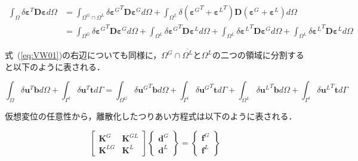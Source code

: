 \begin{align}
  \int_{\Omega} \delta\boldsymbol{\varepsilon}^T\boldsymbol{D}\boldsymbol{\varepsilon} d\Omega
  &=\int_{\Omega^G\cap\overline{\Omega^L}} \delta{\boldsymbol{\varepsilon}^G}^T\boldsymbol{D}\boldsymbol{\varepsilon}^G d\Omega
  +\int_{\Omega^L} \delta({\boldsymbol{\varepsilon}^G}^T+{\boldsymbol{\varepsilon}^L}^T)\boldsymbol{D}(\boldsymbol{\varepsilon}^G+\boldsymbol{\varepsilon}^L) d\Omega \nonumber \\
  &=\int_{\Omega^G} \delta{\boldsymbol{\varepsilon}^G}^T\boldsymbol{D}\boldsymbol{\varepsilon}^G d\Omega
  +\int_{\Omega^L} \delta{\boldsymbol{\varepsilon}^G}^T\boldsymbol{D}\boldsymbol{\varepsilon}^L d\Omega
  +\int_{\Omega^L} \delta{\boldsymbol{\varepsilon}^L}^T\boldsymbol{D}\boldsymbol{\varepsilon}^G d\Omega
  +\int_{\Omega^L} \delta{\boldsymbol{\varepsilon}^L}^T\boldsymbol{D}\boldsymbol{\varepsilon}^L d\Omega
\end{align}

\noindent
式~(\ref{eq:VW01})の右辺についても同様に，$\Omega^G\cap\overline{\Omega^L}$と$\Omega^L$の二つの領域に分割すると以下のように表される．

\begin{equation}
  \int_\Omega \delta\boldsymbol{u}^T\boldsymbol{b} d\Omega+\int_{\Gamma^t} \delta\boldsymbol{u}^T\boldsymbol{t} d\Gamma
  =\int_{\Omega^G} \delta{\boldsymbol{u}^G}^T\boldsymbol{b} d\Omega+\int_{\Gamma^t} \delta{\boldsymbol{u}^G}^T\boldsymbol{t} d\Gamma
  +\int_{\Omega^L} \delta{\boldsymbol{u}^L}^T\boldsymbol{b} d\Omega+\int_{\Gamma^t} \delta{\boldsymbol{u}^L}^T\boldsymbol{t} d\Gamma
\end{equation}

\noindent
仮想変位の任意性から，離散化したつりあい方程式は以下のように表される．

\begin{equation}
  \label{eq:K_array}
  \begin{bmatrix}
    \boldsymbol{K}^G & \boldsymbol{K}^{GL} \\
    \boldsymbol{K}^{LG} & \boldsymbol{K}^L
  \end{bmatrix}
  \left\{
  \begin{array}{c}
    \boldsymbol{d}^G \\
    \boldsymbol{d}^L
  \end{array}
  \right\} =
  \left\{
  \begin{array}{c}
    \boldsymbol{f}^G \\
    \boldsymbol{f}^L
  \end{array}
  \right\}
\end{equation}

